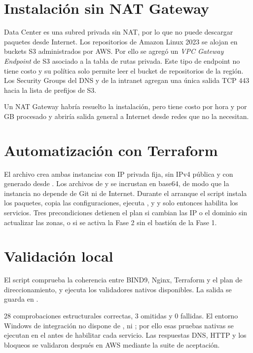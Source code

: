 \section{Instalación sin NAT Gateway}

Data Center es una subred privada sin NAT, por lo que  no puede descargar paquetes
desde Internet. Los repositorios de Amazon Linux 2023 se alojan en buckets S3 administrados por
AWS. Por ello se agregó un \emph{VPC Gateway Endpoint} de S3 asociado a la tabla de rutas
privada. Este tipo de endpoint no tiene costo y su política solo permite leer el bucket de
repositorios de la región. Los Security Groups del DNS y de la intranet agregan una única
salida TCP 443 hacia la lista de prefijos de S3.

\begin{warningbox}
Un NAT Gateway habría resuelto la instalación, pero tiene costo por hora y por GB procesado y
abriría salida general a Internet desde redes que no la necesitan.
\end{warningbox}

\section{Automatización con Terraform}

El archivo  crea ambas instancias con IP privada fija, sin IPv4 pública y
con  generado desde . Los archivos de  y
 se incrustan en base64, de modo que la instancia no depende de Git ni
de Internet. Durante el arranque el script instala los paquetes, copia las configuraciones,
ejecuta ,  y  y solo entonces
habilita los servicios. Tres precondiciones detienen el plan si cambian las IP o el dominio sin
actualizar las zonas, o si se activa la Fase 2 sin el bastión de la Fase 1.

\section{Validación local}

El script  comprueba la coherencia entre BIND9, Nginx,
Terraform y el plan de direccionamiento, y ejecuta los validadores nativos disponibles. La
salida se guarda en .

\begin{infobox}
28 comprobaciones estructurales correctas, 3 omitidas y 0 fallidas. El entorno Windows de
integración no dispone de ,  ni ; por ello esas pruebas
nativas se ejecutan en el  antes de habilitar cada servicio. Las respuestas DNS,
HTTP y los bloqueos se validaron después en AWS mediante la suite de aceptación.
\end{infobox}


